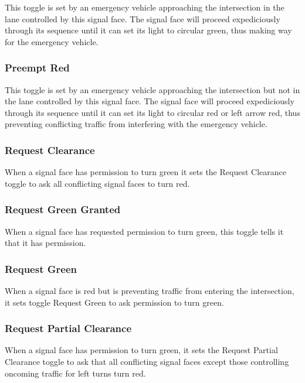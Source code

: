 \documentclass[letterpaper,twoside]{article}
\begin{document}
This toggle is set by an emergency vehicle approaching the intersection
in the lane controlled by this signal face.  The signal face will proceed
expediciously through its sequence until it can set its light to
circular green, thus making way for the emergency vehicle.

\subsubsection{Preempt Red}

This toggle is set by an emergency vehicle approaching the intersection
but not in the lane controlled by this signal face.
The signal face will proceed expediciously through its sequence until it can
set its light to circular red or left arrow red, thus preventing
conflicting traffic from interfering with the emergency vehicle.

\subsubsection{Request Clearance}

When a signal face has permission to turn green it sets the Request Clearance
toggle to ask all conflicting signal faces to turn red.

\subsubsection{Request Green Granted}

When a signal face has requested permission to turn green, this toggle
tells it that it has permission.

\subsubsection{Request Green}

When a signal face is red but is preventing traffic from entering the
intersection, it sets toggle Request Green to ask permission to turn green.

\subsubsection{Request Partial Clearance}

When a signal face has permission to turn green, it sets the Request Partial
Clearance toggle to ask that all conflicting signal faces except
those controlling oncoming traffic for left turns turn red.
\end{document}
